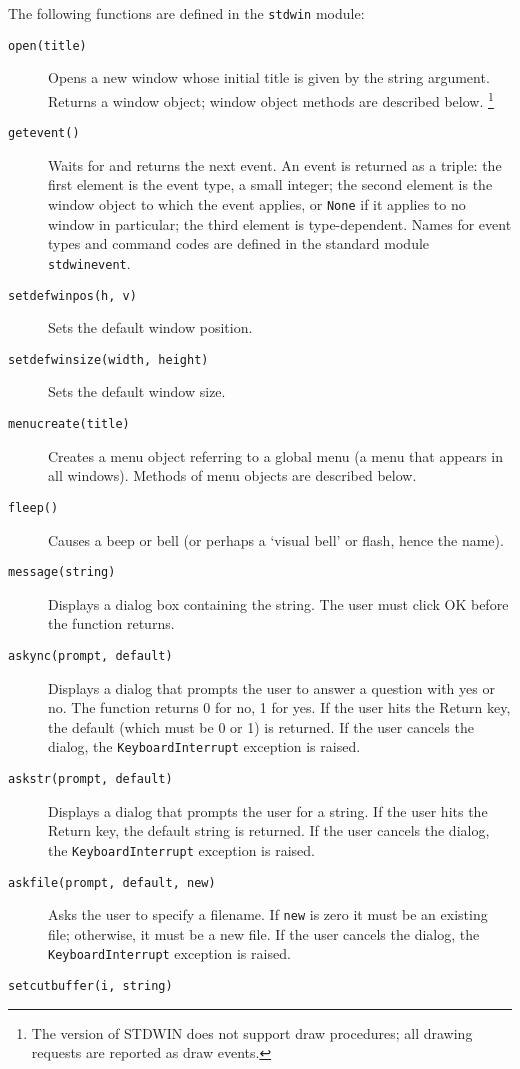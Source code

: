 The following functions are defined in the {\tt stdwin} module:
\begin{description}
\item[{\tt open(title)}]
Opens a new window whose initial title is given by the string argument.
Returns a window object; window object methods are described below.%
\footnote{
The {\Python} version of STDWIN does not support draw procedures; all
drawing requests are reported as draw events.
}
\item[{\tt getevent()}]
Waits for and returns the next event.
An event is returned as a triple: the first element is the event
type, a small integer; the second element is the window object to which
the event applies, or
{\tt None}
if it applies to no window in particular;
the third element is type-dependent.
Names for event types and command codes are defined in the standard
module
{\tt stdwinevent}.
\item[{\tt setdefwinpos(h, v)}]
Sets the default window position.
\item[{\tt setdefwinsize(width, height)}]
Sets the default window size.
\item[{\tt menucreate(title)}]
Creates a menu object referring to a global menu (a menu that appears in
all windows).
Methods of menu objects are described below.
\item[{\tt fleep()}]
Causes a beep or bell (or perhaps a `visual bell' or flash, hence the
name).
\item[{\tt message(string)}]
Displays a dialog box containing the string.
The user must click OK before the function returns.
\item[{\tt askync(prompt, default)}]
Displays a dialog that prompts the user to answer a question with yes or
no.
The function returns 0 for no, 1 for yes.
If the user hits the Return key, the default (which must be 0 or 1) is
returned.
If the user cancels the dialog, the
{\tt KeyboardInterrupt}
exception is raised.
\item[{\tt askstr(prompt, default)}]
Displays a dialog that prompts the user for a string.
If the user hits the Return key, the default string is returned.
If the user cancels the dialog, the
{\tt KeyboardInterrupt}
exception is raised.
\item[{\tt askfile(prompt, default, new)}]
Asks the user to specify a filename.
If
{\tt new}
is zero it must be an existing file; otherwise, it must be a new file.
If the user cancels the dialog, the
{\tt KeyboardInterrupt}
exception is raised.
\item[{\tt setcutbuffer(i, string)}]

\end{description}
